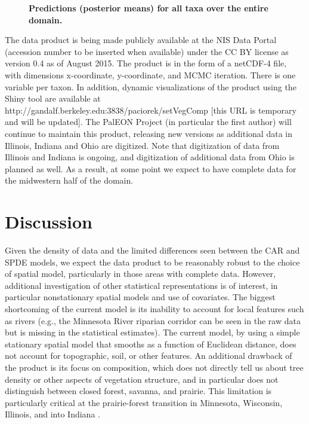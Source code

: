 \documentclass[10pt,letterpaper]{article}
\begin{document}
\begin{figure}

\caption{{\bf Predictions (posterior means) for all taxa over the entire domain.}}
\label{fig:all_predictions}

\end{figure}


The data product is being made publicly available at the NIS Data
Portal (accession number to be inserted when available) under the
CC BY license as version 0.4 as of August 2015. The product is in
the form of a netCDF-4 file, with dimensions x-coordinate, y-coordinate,
and MCMC iteration. There is one variable per taxon. In addition,
dynamic visualizations of the product using the Shiny tool are available
at http://gandalf.berkeley.edu:3838/paciorek/setVegComp [this URL
is temporary and will be updated]. The PalEON Project (in particular
the first author) will continue to maintain this product, releasing
new versions as additional data in Illinois, Indiana and Ohio are
digitized. Note that digitization of data from Illinois and Indiana
is ongoing, and digitization of additional data from Ohio is planned
as well. As a result, at some point we expect to have complete data
for the midwestern half of the domain. 

\section*{Discussion}\label{sec:Discussion}


Given the density of data and the limited differences seen between
the CAR and SPDE models, we expect the data product to be reasonably
robust to the choice of spatial model, particularly in those areas
with complete data. However, additional investigation of other statistical
representations is of interest, in particular nonstationary spatial
models and use of covariates. The biggest shortcoming of the current
model is its inability to account for local features such as rivers
(e.g., the Minnesota River riparian corridor can be seen in the raw
data but is missing in the statistical estimates). The current model,
by using a simple stationary spatial model that smooths as a function
of Euclidean distance, does not account for topographic, soil, or
other features. An additional drawback of the product is its focus
on composition, which does not directly tell us about tree density
or other aspects of vegetation structure, and in particular does not
distinguish between closed forest, savanna, and prairie. This limitation
is particularly critical at the prairie-forest transition in Minnesota,
Wisconsin, Illinois, and into Indiana \cite{transeau1935prairie}.
\end{document}
